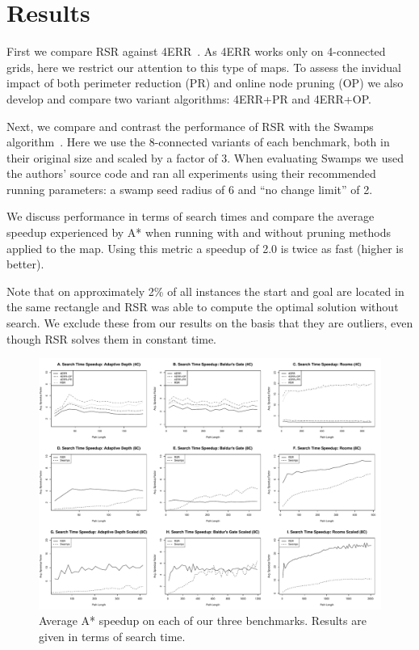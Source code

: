 \section{Results}
\label{sec-results}
First we compare RSR against 4ERR~\cite{harabor10}.
As 4ERR works only on 4-connected grids,
here we restrict our attention to this type of maps.
To assess the invidual impact of both perimeter reduction (PR)
and online node pruning (OP) we also develop and compare two variant
algorithms: 4ERR+PR and 4ERR+OP.

Next, we compare and contrast the performance of RSR
with the Swamps algorithm~\cite{pochter10}.
Here we use the 8-connected variants of each benchmark, both in their original 
size and scaled by a factor of 3.
When evaluating Swamps we used the authors'
source code and ran all experiments using their recommended running parameters:
a swamp seed radius of 6 and ``no change limit'' of 2.  
\par 
We discuss performance in terms of search times and compare 
the average speedup experienced by A* when running with and
without pruning methods applied to the map.  Using this metric a speedup of
2.0 is twice as fast (higher is better).
\par
Note that on approximately 2\% of all instances the start and goal are located 
in the same rectangle and RSR was able to compute the optimal solution without
search.
We exclude these from our results on the basis that they are 
outliers, even though RSR solves them in constant time.
\begin{figure}[t]
       \begin{center}
                       \includegraphics[width=1.85\columnwidth, trim = 10mm 10mm 10mm 0mm]{diagrams/speedup.pdf}
       \end{center}
       \caption{Average A* speedup on each of our three benchmarks. 
		Results are given in terms of search time.}
\label{fig-speedup}
\end{figure}

